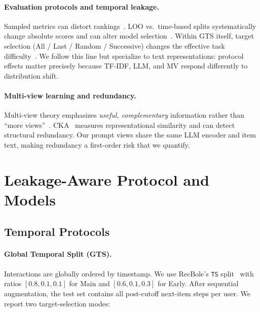 \documentclass[sigconf,natbib=true,anonymous]{acmart}
\newcommand{\tfidf}{\textsc{TF-IDF}\xspace}
\newcommand{\llm}{\textsc{LLM}\xspace}
\newcommand{\mv}{\textsc{MV}\xspace}
\begin{document}
\paragraph{Evaluation protocols and temporal leakage.}
Sampled metrics can distort rankings~\cite{krichene2020sampledmetrics}.
LOO vs.\ time-based splits systematically change absolute scores and can alter model selection~\cite{ji2023evaluation,sun2023reevaluation,meng2020temporal}.
Within GTS itself, target selection (All / Last / Random / Successive) changes the effective task difficulty~\cite{hidasi2018recurrent}.
We follow this line but specialize to text representations: protocol effects matter precisely because \tfidf, \llm, and \mv respond differently to distribution shift.

\paragraph{Multi-view learning and redundancy.}
Multi-view theory emphasizes \emph{useful, complementary} information rather than ``more views''~\cite{xu2013multiview}.
CKA~\cite{kornblith2019cka} measures representational similarity and can detect structural redundancy.
Our prompt views share the same LLM encoder and item text, making redundancy a first-order risk that we quantify.

\section{Leakage-Aware Protocol and Models}
\label{sec:method}

\subsection{Temporal Protocols}
\label{sec:protocol}

\paragraph{Global Temporal Split (GTS).}
Interactions are globally ordered by timestamp.
We use RecBole's \texttt{TS} split~\cite{zhao2021recbole} with ratios $[0.8,0.1,0.1]$ for Main and $[0.6,0.1,0.3]$ for Early.
After sequential augmentation, the test set contains all post-cutoff next-item steps per user.
We report two target-selection modes:
\end{document}
